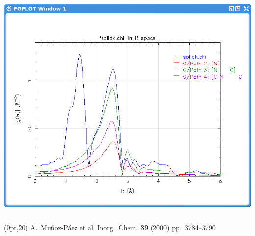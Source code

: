\begin{frame}
\begin{columns}
\begin{column}{4cm}
      \includegraphics[width=\linewidth]{images/NiCN/ms}
    \end{column}
  \end{columns}
  \begin{textblock*}{0.5\linewidth}(0pt,20\TPVertModule) 
    \tiny
    A.\ Mu\~noz-P\'aez et al. Inorg.\ Chem. \textbf{39} (2000) pp.\ 3784--3790
  \end{textblock*}
\end{frame}


